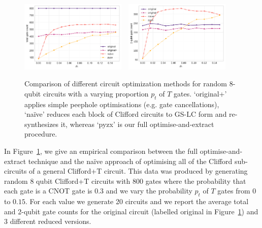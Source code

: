\documentclass[a4paper,onecolumn,superscriptaddress,11pt,accepted=2020-04-27]{quantumarticle}
\theoremstyle{definition}
\begin{document}

\begin{figure}%
    \centering
    \includegraphics[width=0.45\textwidth]{graphics/gatecount.pdf}\ \ 
    \includegraphics[width=0.45\textwidth]{graphics/gatecount-2q.pdf}
    \caption{Comparison of different circuit optimization methods for random 8-qubit circuits with a varying proportion $p_t$ of $T$ gates. `original+' applies simple peephole optimisations (e.g. gate cancellations), `na\"ive' reduces each block of Clifford circuits to GS-LC form and re-synthesizes it, whereas `pyzx' is our full optimise-and-extract procedure.}\label{fig:experiment-gateopt}
\end{figure}

In Figure~\ref{fig:experiment-gateopt}, we give an empirical comparison between the full optimise-and-extract technique and the na\"ive approach of optimising all of the Clifford sub-circuits of a general Clifford+T circuit. This data was produced by generating random 8 qubit Clifford+T circuits with 800 gates where the probability that each gate is a CNOT gate is $0.3$ and we vary the probability $p_t$ of $T$ gates from $0$ to $0.15$. For each value we generate 20 circuits and we report the average total and 2-qubit gate counts for the original circuit (labelled \textsf{original} in Figure~\ref{fig:experiment-gateopt}) and 3 different reduced versions.
\end{document}
